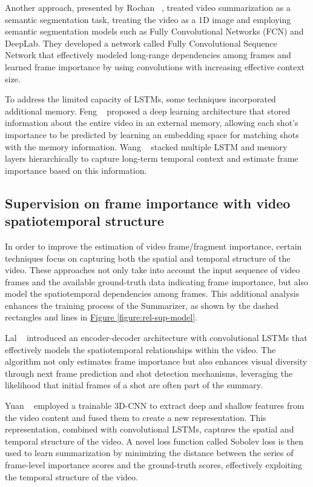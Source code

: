 Another approach, presented by Rochan \etal~\cite{rochan2018sequence}, treated video summarization as a semantic segmentation task, treating the video as a 1D image and employing semantic segmentation models such as Fully Convolutional Networks (FCN) and DeepLab. They developed a network called Fully Convolutional Sequence Network that effectively modeled long-range dependencies among frames and learned frame importance by using convolutions with increasing effective context size.

To address the limited capacity of LSTMs, some techniques incorporated additional memory. Feng \etal~\cite{feng2018memory} proposed a deep learning architecture that stored information about the entire video in an external memory, allowing each shot's importance to be predicted by learning an embedding space for matching shots with the memory information. Wang \etal~\cite{wang2019stacked} stacked multiple LSTM and memory layers hierarchically to capture long-term temporal context and estimate frame importance based on this information.


\subsection{Supervision on frame importance with video spatiotemporal structure}
\label{subsec:rel-sup-spatiotemporal}

In order to improve the estimation of video frame/fragment importance, certain techniques focus on capturing both the spatial and temporal structure of the video. These approaches not only take into account the input sequence of video frames and the available ground-truth data indicating frame importance, but also model the spatiotemporal dependencies among frames. This additional analysis enhances the training process of the Summarizer, as shown by the dashed rectangles and lines in \hyperref[figure:rel-sup-model]{Figure \ref{figure:rel-sup-model}}.

Lal \etal~\cite{lal2019online} introduced an encoder-decoder architecture with convolutional LSTMs that effectively models the spatiotemporal relationships within the video. The algorithm not only estimates frame importance but also enhances visual diversity through next frame prediction and shot detection mechanisms, leveraging the likelihood that initial frames of a shot are often part of the summary.

Yuan \etal~\cite{yuan2019spatiotemporal} employed a trainable 3D-CNN to extract deep and shallow features from the video content and fused them to create a new representation. This representation, combined with convolutional LSTMs, captures the spatial and temporal structure of the video. A novel loss function called Sobolev loss is then used to learn summarization by minimizing the distance between the series of frame-level importance scores and the ground-truth scores, effectively exploiting the temporal structure of the video.


